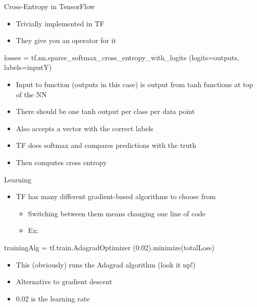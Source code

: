 \documentclass[aspectratio=169]{beamer}
\begin{document}
\begin{frame}[fragile]{Cross-Entropy in TensorFlow}
\begin{itemize}
\item Trivially implemented in TF
\item They give you an operator for it
\end{itemize}
	\begin{SQL}
losses = tf.nn.sparse_softmax_cross_entropy_with_logits
	(logits=outputs, labels=inputY)
	\end{SQL}
	\begin{itemize}
	\item Input to function (outputs in this case) is output from tanh functions at top of the NN
	\item There should be one tanh output per class per data point
	\item Also accepts  a vector with the correct labels
	\item TF does softmax and compares predictions with the truth
	\item Then computes cross entropy
	\end{itemize}
\end{frame}
\begin{frame}[fragile]{Learning}

\begin{itemize}
\item TF has many different gradient-based algorithms to choose from
	\begin{itemize}
	\item Switching between them means changing one line of code
	\item Ex:
	\end{itemize}
\end{itemize}
	\begin{SQL}
trainingAlg = tf.train.AdagradOptimizer
     (0.02).minimize(totalLoss)
	\end{SQL}
	\begin{itemize}
	\item This (obviously) runs the Adagrad algorithm (look it up!)
	\item Alternative to gradient descent
	\item 0.02 is the learning rate
	\end{itemize}
\end{frame}
\end{document}
